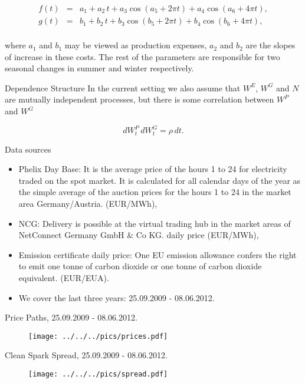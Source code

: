 \begin{eqnarray}
f(t) &=& a_1 + a_2\,t + a_3\cos(a_5 + 2\pi t) + a_4\cos(a_6 + 4\pi t), \nonumber \\
g(t) &=& b_1 + b_2\,t + b_3\cos(b_5 + 2\pi t) + b_4\cos(b_6 + 4\pi t), \nonumber \\
\label{grseasonality}
\end{eqnarray}

where $a_1$ and $b_1$ may be viewed as production expenses, $a_2$ and $b_2$ are the slopes of increase in these costs. The rest of the parameters are responsible for two seasonal changes in summer and winter respectively.

{Dependence Structure}
In the current setting we also assume that $W^E$, $W^G$ and $N$ are mutually independent processes, but there is some correlation between  $W^P$ and $W^G$

\begin{equation}
d{W}^P_t\,d{W}^G_t = \rho\,d{t}.
\label{corr}
\end{equation}

{Data sources}
\begin{itemize}
\item Phelix Day Base: It is the average price of the hours 1 to 24 for electricity traded on the spot market.
It is calculated for all calendar days of the year as the simple average of the auction prices for the
hours 1 to 24 in the market area Germany/Austria. (EUR/MWh),
\item NCG: Delivery is possible at the virtual trading hub in the market areas of
NetConnect Germany GmbH \& Co KG. daily price (EUR/MWh),
\item Emission certificate daily price: One EU emission allowance confers the right to emit one tonne of carbon dioxide or one tonne of
carbon dioxide equivalent. (EUR/EUA).
\item We cover the last three years: 25.09.2009 - 08.06.2012.
\end{itemize}

{Price Paths, 25.09.2009 - 08.06.2012.}
\begin{figure}[htp]
\centering
\texttt{[image: ../../../pics/prices.pdf]}
\label{prices}
\end{figure}

{Clean Spark Spread, 25.09.2009 - 08.06.2012.}
\begin{figure}[htp]
\centering
\texttt{[image: ../../../pics/spread.pdf]}
\label{spread}
\end{figure}

